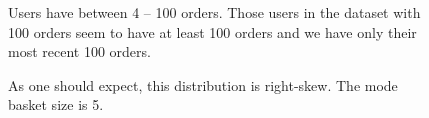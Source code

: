 \documentclass[11pt]{article}
\theoremstyle{definition}
\numberwithin{equation}{section}
\begin{document}

\begin{figure}[p]
\begin{center}
\caption[Histogram of order counts by user]{Users have between 4 -- 100 orders. Those users in the dataset with 100 orders seem to have at least 100 orders and we have only their most recent 100 orders.}
\label{fig:orders-histogram}
\end{center}
\end{figure}


\begin{figure}[p]
\begin{center}
\end{center}
\caption[Histogram of basket sizes]{As one should expect, this distribution is right-skew. The mode basket size is 5.}
\label{fig:basket-size-histogram}
\end{figure}

\end{document}
